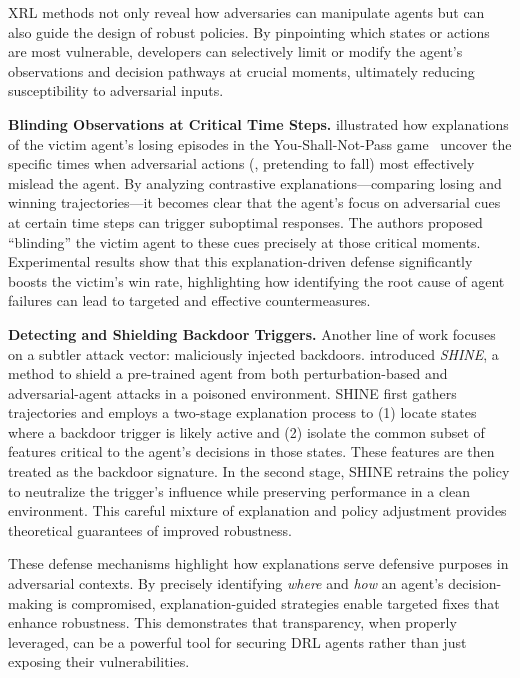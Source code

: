 XRL methods not only reveal how adversaries can manipulate agents but can also guide the design of robust policies. By pinpointing which states or actions are most vulnerable, developers can selectively limit or modify the agent's observations and decision pathways at crucial moments, ultimately reducing susceptibility to adversarial inputs.

\textbf{Blinding Observations at Critical Time Steps.}
\citet{guo2021edge} illustrated how explanations of the victim agent's losing episodes in the You-Shall-Not-Pass game~\citep{todorov2012mujoco} uncover the specific times when adversarial actions (\eg, pretending to fall) most effectively mislead the agent. By analyzing contrastive explanations—comparing losing and winning trajectories—it becomes clear that the agent's focus on adversarial cues at certain time steps can trigger suboptimal responses. The authors proposed ``blinding'' the victim agent to these cues precisely at those critical moments. Experimental results show that this explanation-driven defense significantly boosts the victim's win rate, highlighting how identifying the root cause of agent failures can lead to targeted and effective countermeasures.

\textbf{Detecting and Shielding Backdoor Triggers.}
Another line of work focuses on a subtler attack vector: maliciously injected backdoors. \citet{yuan2024shine} introduced \textit{SHINE}, a method to shield a pre-trained agent from both perturbation-based and adversarial-agent attacks in a poisoned environment. SHINE first gathers trajectories and employs a two-stage explanation process to (1) locate states where a backdoor trigger is likely active and (2) isolate the common subset of features critical to the agent's decisions in those states. These features are then treated as the backdoor signature. In the second stage, SHINE retrains the policy to neutralize the trigger's influence while preserving performance in a clean environment. This careful mixture of explanation and policy adjustment provides theoretical guarantees of improved robustness.

These defense mechanisms highlight how explanations serve defensive purposes in adversarial contexts. By precisely identifying \emph{where} and \emph{how} an agent's decision-making is compromised, explanation-guided strategies enable targeted fixes that enhance robustness. This demonstrates that transparency, when properly leveraged, can be a powerful tool for securing DRL agents rather than just exposing their vulnerabilities.

